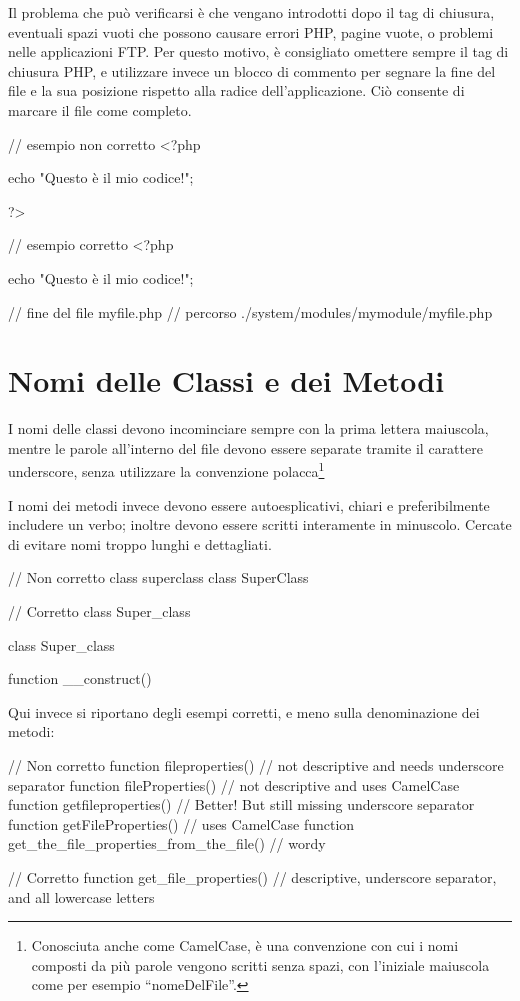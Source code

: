 Il problema che può verificarsi è che vengano introdotti dopo il tag di chiusura, eventuali spazi vuoti che possono causare errori PHP, pagine vuote, o problemi nelle applicazioni \ac{FTP}. Per questo motivo, è consigliato omettere sempre il tag di chiusura PHP, e utilizzare invece un blocco di commento per segnare la fine del file e la sua posizione rispetto alla radice dell'applicazione. Ciò consente di marcare il file come completo.

\begin{code}
// esempio non corretto
<?php

echo "Questo è il mio codice!";

?>

// esempio corretto
<?php

echo "Questo è il mio codice!";

// fine del file myfile.php
// percorso ./system/modules/mymodule/myfile.php
\end{code}

\section{Nomi delle Classi e dei Metodi}
I nomi delle classi devono incominciare sempre con la prima lettera maiuscola, mentre le parole all'interno del file devono essere separate tramite il carattere underscore, senza utilizzare la convenzione polacca\footnote{Conosciuta anche come CamelCase, è una convenzione con cui i nomi composti da più parole vengono scritti senza spazi, con l'iniziale maiuscola come per esempio ``nomeDelFile''.}

I nomi dei metodi invece devono essere autoesplicativi, chiari e preferibilmente includere un verbo; inoltre devono essere scritti interamente in minuscolo. Cercate di evitare nomi troppo lunghi e dettagliati.

\begin{code}
// Non corretto
class superclass
class SuperClass

// Corretto
class Super_class
\end{code}


\begin{code}
class Super_class {

	function __construct()
	{

	}
}
\end{code}

Qui invece si riportano degli esempi corretti, e meno sulla denominazione dei metodi:
\begin{code}
// Non corretto
function fileproperties()		// not descriptive and needs underscore separator
function fileProperties()		// not descriptive and uses CamelCase
function getfileproperties()		// Better!  But still missing underscore separator
function getFileProperties()		// uses CamelCase
function get_the_file_properties_from_the_file()	// wordy

// Corretto
function get_file_properties()	// descriptive, underscore separator, and all lowercase letters
\end{code}

